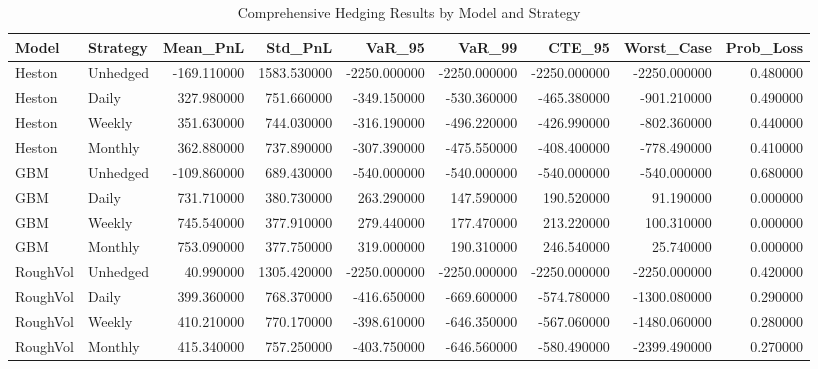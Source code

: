 \begin{table}
\caption{Comprehensive Hedging Results by Model and Strategy}
\label{tab:comprehensive_results}
\begin{tabular}{llrrrrrrr}
\toprule
Model & Strategy & Mean_PnL & Std_PnL & VaR_95 & VaR_99 & CTE_95 & Worst_Case & Prob_Loss \\
\midrule
Heston & Unhedged & -169.110000 & 1583.530000 & -2250.000000 & -2250.000000 & -2250.000000 & -2250.000000 & 0.480000 \\
Heston & Daily & 327.980000 & 751.660000 & -349.150000 & -530.360000 & -465.380000 & -901.210000 & 0.490000 \\
Heston & Weekly & 351.630000 & 744.030000 & -316.190000 & -496.220000 & -426.990000 & -802.360000 & 0.440000 \\
Heston & Monthly & 362.880000 & 737.890000 & -307.390000 & -475.550000 & -408.400000 & -778.490000 & 0.410000 \\
GBM & Unhedged & -109.860000 & 689.430000 & -540.000000 & -540.000000 & -540.000000 & -540.000000 & 0.680000 \\
GBM & Daily & 731.710000 & 380.730000 & 263.290000 & 147.590000 & 190.520000 & 91.190000 & 0.000000 \\
GBM & Weekly & 745.540000 & 377.910000 & 279.440000 & 177.470000 & 213.220000 & 100.310000 & 0.000000 \\
GBM & Monthly & 753.090000 & 377.750000 & 319.000000 & 190.310000 & 246.540000 & 25.740000 & 0.000000 \\
RoughVol & Unhedged & 40.990000 & 1305.420000 & -2250.000000 & -2250.000000 & -2250.000000 & -2250.000000 & 0.420000 \\
RoughVol & Daily & 399.360000 & 768.370000 & -416.650000 & -669.600000 & -574.780000 & -1300.080000 & 0.290000 \\
RoughVol & Weekly & 410.210000 & 770.170000 & -398.610000 & -646.350000 & -567.060000 & -1480.060000 & 0.280000 \\
RoughVol & Monthly & 415.340000 & 757.250000 & -403.750000 & -646.560000 & -580.490000 & -2399.490000 & 0.270000 \\
\bottomrule
\end{tabular}
\end{table}
